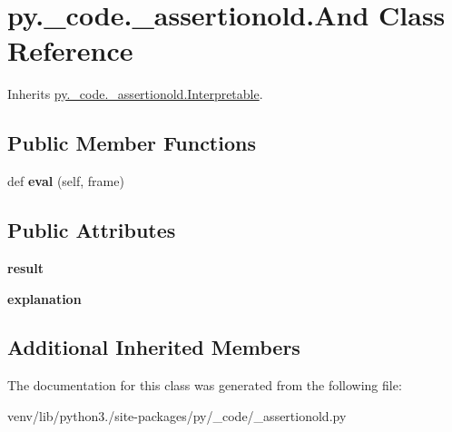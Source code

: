 \hypertarget{classpy_1_1__code_1_1__assertionold_1_1_and}{}\section{py.\+\_\+code.\+\_\+assertionold.\+And Class Reference}
\label{classpy_1_1__code_1_1__assertionold_1_1_and}


Inherits \hyperlink{classpy_1_1__code_1_1__assertionold_1_1_interpretable}{py.\+\_\+code.\+\_\+assertionold.\+Interpretable}.

\subsection*{Public Member Functions}
\begin{DoxyCompactItemize}
\item 
\mbox{\label{classpy_1_1__code_1_1__assertionold_1_1_and_a6a7a1a4251a1e3b4f7188c75cd7fc398}} 
def {\bfseries eval} (self, frame)
\end{DoxyCompactItemize}
\subsection*{Public Attributes}
\begin{DoxyCompactItemize}
\item 
\mbox{\label{classpy_1_1__code_1_1__assertionold_1_1_and_a8ab6d9b16b81571dff8132eabd6eea05}} 
{\bfseries result}
\item 
\mbox{\label{classpy_1_1__code_1_1__assertionold_1_1_and_a0858db4127c5f3a60d12bd64012b9604}} 
{\bfseries explanation}
\end{DoxyCompactItemize}
\subsection*{Additional Inherited Members}


The documentation for this class was generated from the following file\+:\begin{DoxyCompactItemize}
\item 
venv/lib/python3./site-\/packages/py/\+\_\+code/\+\_\+assertionold.\+py\end{DoxyCompactItemize}
